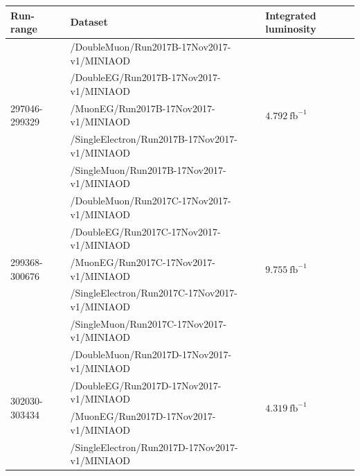 \begin{table}[h]
\scriptsize
    \centering
    \begin{tabular}{|l|l|l|} 
\hline %
\hline %
Run-range & Dataset & Integrated luminosity \\
\hline %
\hline %
\multirow{5}{*}{297046-299329} & /DoubleMuon/Run2017B-17Nov2017-v1/MINIAOD &  \multirow{5}{*}{$4.792\ \text{fb}^{-1}$} \\ 
& /DoubleEG/Run2017B-17Nov2017-v1/MINIAOD &  \\ 
& /MuonEG/Run2017B-17Nov2017-v1/MINIAOD &  \\ 
& /SingleElectron/Run2017B-17Nov2017-v1/MINIAOD &  \\ 
& /SingleMuon/Run2017B-17Nov2017-v1/MINIAOD &  \\ 
\hline
\multirow{5}{*}{299368-300676} & /DoubleMuon/Run2017C-17Nov2017-v1/MINIAOD &  \multirow{5}{*}{$9.755\ \text{fb}^{-1}$}  \\ 
& /DoubleEG/Run2017C-17Nov2017-v1/MINIAOD &  \\ 
& /MuonEG/Run2017C-17Nov2017-v1/MINIAOD &  \\ 
& /SingleElectron/Run2017C-17Nov2017-v1/MINIAOD &  \\ 
& /SingleMuon/Run2017C-17Nov2017-v1/MINIAOD &  \\ 
\hline
\multirow{5}{*}{302030-303434} & /DoubleMuon/Run2017D-17Nov2017-v1/MINIAOD &  \multirow{5}{*}{$4.319\ \text{fb}^{-1}$} \\ 
& /DoubleEG/Run2017D-17Nov2017-v1/MINIAOD &  \\ 
& /MuonEG/Run2017D-17Nov2017-v1/MINIAOD &  \\ 
& /SingleElectron/Run2017D-17Nov2017-v1/MINIAOD &  \\ 

\end{tabular}
\end{table}
